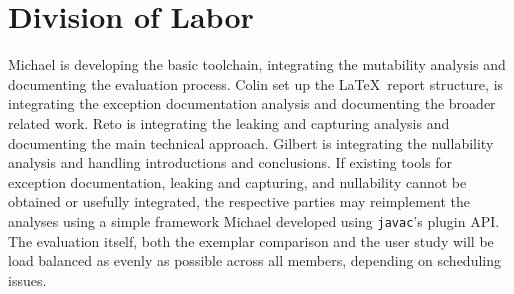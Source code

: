 
\section{Division of Labor}

Michael is developing the basic toolchain, integrating the mutability analysis
and documenting the evaluation process. Colin set up the \LaTeX\ report
structure, is integrating the exception documentation analysis and documenting
the broader related work. Reto is integrating the leaking and capturing
analysis and documenting the main technical approach. Gilbert is integrating
the nullability analysis and handling introductions and conclusions. If
existing tools for exception documentation, leaking and capturing, and
nullability cannot be obtained or usefully integrated, the respective parties
may reimplement the analyses using a simple framework Michael developed using
\texttt{javac}'s plugin API.  The evaluation itself, both the exemplar
comparison and the user study will be load balanced as evenly as possible across
all members, depending on scheduling issues.
